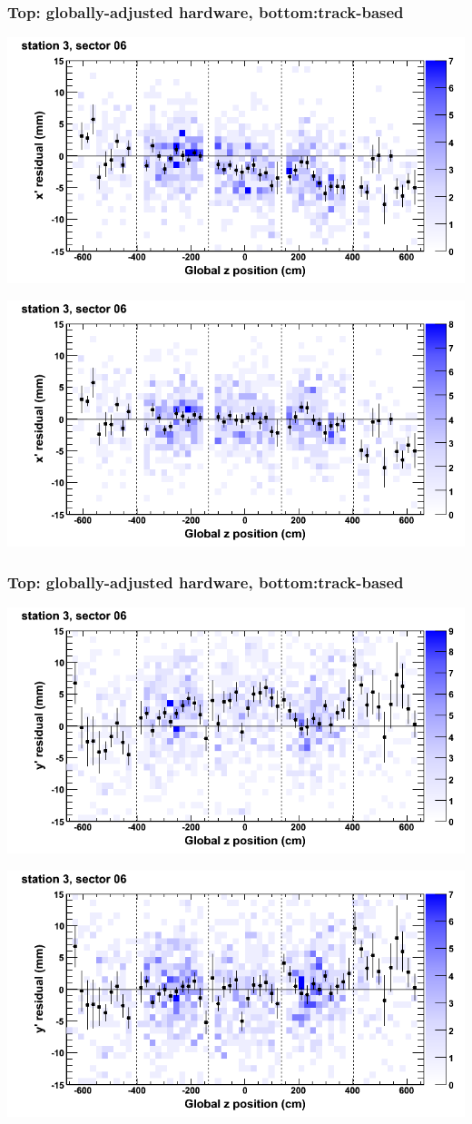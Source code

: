 \documentclass[compress]{beamer}
\begin{document}
\begin{frame}
\frametitle{Top: globally-adjusted hardware, bottom:track-based}
\includegraphics[width=0.7\linewidth]{NOV4_mapplots_HW/DTvsz_st3sec06_x.png}

\includegraphics[width=0.7\linewidth]{NOV4_mapplots/DTvsz_st3sec06_x.png}
\end{frame}

\begin{frame}
\frametitle{Top: globally-adjusted hardware, bottom:track-based}
\includegraphics[width=0.7\linewidth]{NOV4_mapplots_HW/DTvsz_st3sec06_y.png}

\includegraphics[width=0.7\linewidth]{NOV4_mapplots/DTvsz_st3sec06_y.png}
\end{frame}
\end{document}
